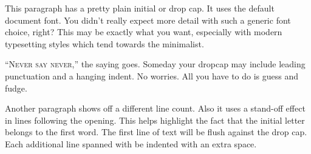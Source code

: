 \documentclass{article}
\begin{document}
\lettrine[nindent=0sp]{T}{}his paragraph has a pretty plain initial or drop cap.
It uses the default document font.
You didn't really expect more detail with such a generic font choice, right?
This may be exactly what you want, especially with modern typesetting styles which tend towards the minimalist.

\lettrine[lhang=.4,nindent=0sp]{``N}{ever say never,}'' the saying goes.
Someday your dropcap may include leading punctuation {and} a hanging indent.
No worries.
All you have to do is guess and fudge.

\lettrine[lines=3,nindent=1em]{A}{}nother paragraph shows off a different line count.
Also it uses a stand-off effect in lines following the opening.
This helps highlight the fact that the initial letter belongs to the first word.
The first line of text will be flush against the drop cap.
Each additional line spanned with be indented with an extra space.
\end{document}
